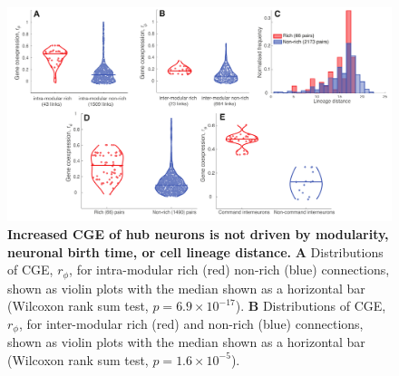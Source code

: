 \documentclass[10pt,letterpaper]{article}
\begin{document}
{%
\begin{figure}[!h]
\centering
    \includegraphics[width=1\textwidth]{extrasALL2.pdf}
 \caption{
 \textbf{Increased CGE of hub neurons is not driven by modularity, neuronal birth time, or cell lineage distance.}
\textbf{A} Distributions of CGE, $r_\phi$, for intra-modular rich (red) non-rich (blue) connections, shown as violin plots with the median shown as a horizontal bar (Wilcoxon rank sum test, $p = 6.9 \times 10^{-17}$).
\textbf{B} Distributions of CGE, $r_\phi$, for inter-modular rich (red) and non-rich (blue) connections, shown as violin plots with the median shown as a horizontal bar (Wilcoxon rank sum test, $p = 1.6 \times 10^{-5}$).
}
\end{figure}}
\end{document}

